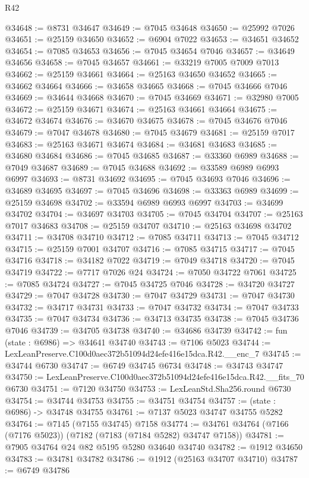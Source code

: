 \begin{lexlean}{R42}
\begin{coremodule}
{@34648 := @8731 @34647
@34649 := @7045 @34648
@34650 := @25992 @7026
@34651 := @25159 @34650
@34652 := @6904 @7022
@34653 := @34651 @34652
@34654 := @7085 @34653
@34656 := @7045 @34654 @7046
@34657 := @34649 @34656
@34658 := @7045 @34657
@34661 := @33219 @7005 @7009 @7013
@34662 := @25159 @34661
@34664 := @25163 @34650 @34652
@34665 := @34662 @34664
@34666 := @34658 @34665
@34668 := @7045 @34666 @7046
@34669 := @34644 @34668
@34670 := @7045 @34669
@34671 := @32980 @7005
@34672 := @25159 @34671
@34674 := @25163 @34661 @34664
@34675 := @34672 @34674
@34676 := @34670 @34675
@34678 := @7045 @34676 @7046
@34679 := @7047 @34678
@34680 := @7045 @34679
@34681 := @25159 @7017
@34683 := @25163 @34671 @34674
@34684 := @34681 @34683
@34685 := @34680 @34684
@34686 := @7045 @34685
@34687 := @33360 @6989
@34688 := @7049 @34687
@34689 := @7045 @34688
@34692 := @33589 @6989 @6993 @6997
@34693 := @8731 @34692
@34695 := @7045 @34693 @7046
@34696 := @34689 @34695
@34697 := @7045 @34696
@34698 := @33363 @6989
@34699 := @25159 @34698
@34702 := @33594 @6989 @6993 @6997
@34703 := @34699 @34702
@34704 := @34697 @34703
@34705 := @7045 @34704
@34707 := @25163 @7017 @34683
@34708 := @25159 @34707
@34710 := @25163 @34698 @34702
@34711 := @34708 @34710
@34712 := @7085 @34711
@34713 := @7045 @34712
@34715 := @25159 @7001 @34707
@34716 := @7085 @34715
@34717 := @7045 @34716
@34718 := @34182 @7022
@34719 := @7049 @34718
@34720 := @7045 @34719
@34722 := @7717 @7026 @24
@34724 := @7050 @34722 @7061
@34725 := @7085 @34724
@34727 := @7045 @34725 @7046
@34728 := @34720 @34727
@34729 := @7047 @34728
@34730 := @7047 @34729
@34731 := @7047 @34730
@34732 := @34717 @34731
@34733 := @7047 @34732
@34734 := @7047 @34733
@34735 := @7047 @34734
@34736 := @34713 @34735
@34738 := @7045 @34736 @7046
@34739 := @34705 @34738
@34740 := @34686 @34739
@34742 := fun (state : @6986) => @34641 @34740
@34743 := @7106 @5023
@34744 := LexLeanPreserve.C100d0aec372b51094d24efe416e15dca.R42.__enc_7
@34745 := @34744 @6730
@34747 := @6749 @34745 @6734
@34748 := @34743 @34747
@34750 := LexLeanPreserve.C100d0aec372b51094d24efe416e15dca.R42.__fits_70 @6730
@34751 := @7120 @34750
@34753 := LexLeanStd.Sha256.round @6730
@34754 := @34744 @34753
@34755 := @34751 @34754
@34757 := (state : @6986) -> @34748 @34755
@34761 := @7137 @5023 @34747 @34755 @5282
@34764 := @7145 (@7155 @34745) @7158
@34774 := @34761 @34764 (@7166 (@7176 @5023)) (@7182 (@7183 (@7184 @5282) @34747 @7158))
@34781 := @7905 @34764 @24 @82 @5195 @5280 @34640 @34740
@34782 := @1912 @34650
@34783 := @34781 @34782
@34786 := @1912 (@25163 @34707 @34710)
@34787 := @6749 @34786
}
\end{coremodule}
\end{lexlean}
